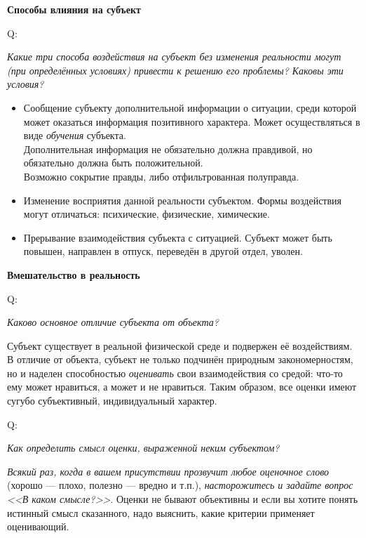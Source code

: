 \documentclass{article}
\newcommand{\note}[1]{\textit{#1}}
\renewcommand{\subsection}[1]{
	\vspace{2em}
	\begin{flushright}
		\large
		\textbf{#1}
	\end{flushright}
	}
\newcommand{\question}[2]{
	\begin{flushright}
		Q:\hspace{2ex}\vline\hspace{2ex}
		\begin{minipage}{0.9\textwidth}
			\large
			\textit{#1}
		\end{minipage}
	\end{flushright}
	\begin{center}
		\begin{minipage}{0.95\textwidth}
			#2
		\end{minipage}
	\end{center}
	}
\begin{document}
\subsection{Способы влияния на субъект}
\question{Какие три способа воздействия на субъект без изменения реальности могут (при определённых условиях) привести к решению его проблемы? Каковы эти условия?}{
\begin{itemize}
	\item Сообщение субъекту дополнительной информации о ситуации, среди которой может оказаться информация позитивного характера. Может осуществляться в виде \note{обучения} субъекта.\\Дополнительная информация не обязательно должна правдивой, но обязательно должна быть положительной.\\Возможно сокрытие правды, либо отфильтрованная полуправда.
	\item Изменение восприятия данной реальности субъектом. Формы воздействия могут отличаться: психические, физические, химические.
	\item Прерывание взаимодействия субъекта с ситуацией. Субъект может быть повышен, направлен в отпуск, переведён в другой отдел, уволен.
\end{itemize}}
\subsection{Вмешательство в реальность}
\question{Каково основное отличие субъекта от объекта?}{Субъект существует в реальной физической среде и подвержен её воздействиям. В отличие от объекта, субъект не только подчинён природным закономерностям, но и наделен способностью \note{оценивать} свои взаимодействия со средой: что-то ему может нравиться, а может и не нравиться. Таким образом, все оценки имеют сугубо субъективный, индивидуальный характер.}
\question{Как определить смысл оценки, выраженной неким субъектом?}{\note{Всякий раз, когда в вашем присутствии прозвучит любое оценочное слово} (хорошо --- плохо, полезно --- вредно и т.п.), \note{насторожитесь и задайте вопрос <<В каком смысле?>>}. Оценки не бывают объективны и если вы хотите понять истинный смысл сказанного, надо выяснить, какие критерии применяет оценивающий.}
\end{document}
